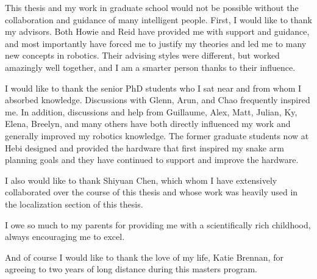 \documentclass[hidelinks, 12pt]{cmuthesis}
\begin{document}
\begin{acknowledgments}
  This thesis and my work in graduate school would not be possible without the collaboration and guidance of many intelligent people.
  First, I would like to thank my advisors. Both Howie and Reid have provided me with support and guidance, and most importantly have forced me to justify my theories and led me to many new concepts in robotics. Their advising styles were different, but worked amazingly well together, and I am a smarter person thanks to their influence.
  
  I would like to thank the senior PhD students who I sat near and from whom I absorbed knowledge. Discussions with Glenn, Arun, and Chao frequently inspired me. In addition, discussions and help from Guillaume, Alex, Matt, Julian, Ky, Elena, Breelyn, and many others have both directly influenced my work and generally improved my robotics knowledge.
  The former graduate students now at Hebi designed and provided the hardware that first inspired my snake arm planning goals and they have continued to support and improve the hardware.

  I also would like to thank Shiyuan Chen, which whom I have extensively collaborated over the course of this thesis and whose work was heavily used in the localization section of this thesis.

  I owe so much to my parents for providing me with a scientifically rich childhood, always encouraging me to excel.
  
  And of course I would like to thank the love of my life, Katie Brennan, for agreeing to two years of long distance during this masters program.
  
\end{acknowledgments}



\tableofcontents
\listoffigures

\mainmatter


%
%
%
%
%
\end{document}
